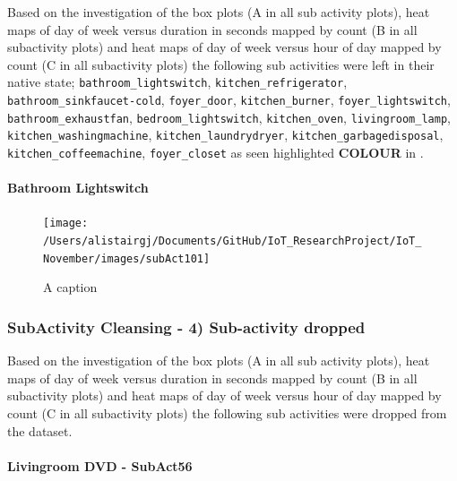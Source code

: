 \documentclass[11pt,]{article}
\let\oldparagraph\paragraph
\renewcommand{\paragraph}[1]{\oldparagraph{#1}\mbox{}}
\begin{document}
Based on the investigation of the box plots (A in all sub activity
plots), heat maps of day of week versus duration in seconds mapped by
count (B in all subactivity plots) and heat maps of day of week versus
hour of day mapped by count (C in all subactivity plots) the following
sub activities were left in their native state;
\texttt{bathroom\_lightswitch}, \texttt{kitchen\_refrigerator},
\texttt{bathroom\_sinkfaucet-cold}, \texttt{foyer\_door},
\texttt{kitchen\_burner}, \texttt{foyer\_lightswitch},
\texttt{bathroom\_exhaustfan}, \texttt{bedroom\_lightswitch},
\texttt{kitchen\_oven}, \texttt{livingroom\_lamp},
\texttt{kitchen\_washingmachine}, \texttt{kitchen\_laundrydryer},
\texttt{kitchen\_garbagedisposal}, \texttt{kitchen\_coffeemachine},
\texttt{foyer\_closet} as seen highlighted \textbf{COLOUR} in .

\hypertarget{bathroom-lightswitch}{%
\paragraph{Bathroom Lightswitch}\label{bathroom-lightswitch}}

\begin{figure}[H]

{\centering \texttt{[image: /Users/alistairgj/Documents/GitHub/IoT\_ResearchProject/IoT\_November/images/subAct101]} 

}

\caption{A caption}\label{fig:subAct101}
\end{figure}

\hypertarget{subactivity-cleansing---4-sub-activity-dropped}{%
\subsubsection{SubActivity Cleansing - 4) Sub-activity
dropped}\label{subactivity-cleansing---4-sub-activity-dropped}}

Based on the investigation of the box plots (A in all sub activity
plots), heat maps of day of week versus duration in seconds mapped by
count (B in all subactivity plots) and heat maps of day of week versus
hour of day mapped by count (C in all subactivity plots) the following
sub activities were dropped from the dataset.

\hypertarget{livingroom-dvd---subact56}{%
\paragraph{Livingroom DVD - SubAct56}\label{livingroom-dvd---subact56}}
\end{document}
